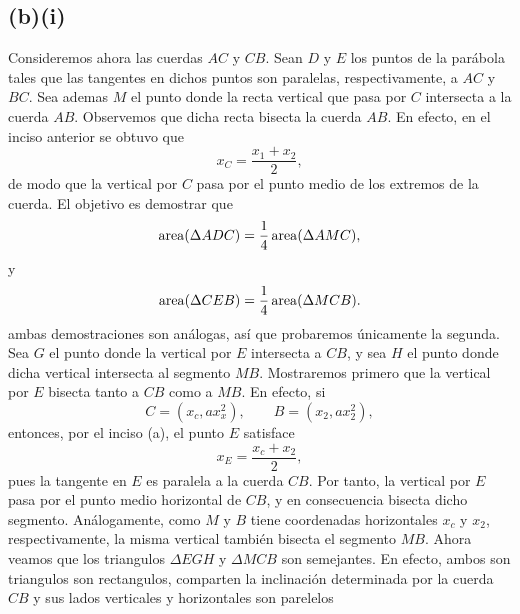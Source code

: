 \documentclass[12pt,a4paper]{article}
\begin{document}
\begin{solucion}
        \subsection*{(b)(i)}
        Consideremos ahora las cuerdas $AC$ y $CB$. Sean $D$ y $E$ los puntos de la parábola
        tales que las tangentes en dichos puntos son paralelas, respectivamente, a $AC$ y
        $BC$. Sea ademas $M$ el punto donde la recta vertical que pasa por $C$ intersecta
        a la cuerda $AB$. Observemos que dicha recta bisecta la cuerda $AB$. En efecto,
        en el inciso anterior se obtuvo que
        \begin{equation*}
            x_{C}=\frac{x_{1}+x_{2}}{2},
        \end{equation*}
        de modo que la vertical por $C$ pasa por el punto medio de los extremos de la cuerda.
        El objetivo es demostrar que
        \begin{equation*}
            \operatorname{area}(\Delta ADC)=\frac{1}{4}\operatorname{area}(\Delta AMC),
        \end{equation*}
        y
        \begin{equation*}
            \operatorname{area}(\Delta CEB)=\frac{1}{4}\operatorname{area}(\Delta MCB).
        \end{equation*}
        ambas demostraciones son análogas, así que probaremos únicamente
        la segunda. Sea $G$ el punto donde la vertical por $E$ intersecta
        a $CB$, y sea $H$ el punto donde dicha vertical intersecta al segmento
        $MB$. Mostraremos primero que la vertical por $E$ bisecta tanto a $CB$ como a $MB$.
        En efecto, si
        \begin{equation*}
            C=(x_{c},ax_{x}^{2}),\qquad B=(x_{2},ax_{2}^{2}),
        \end{equation*}
        entonces, por el inciso (a), el punto $E$ satisface
        \begin{equation*}
            x_{E}=\frac{x_{c}+x_{2}}{2},
        \end{equation*}
        pues la tangente en $E$ es paralela a la cuerda $CB$. Por tanto, la vertical
        por $E$ pasa por el punto medio horizontal de $CB$, y en consecuencia bisecta
        dicho segmento. Análogamente, como $M$ y $B$ tiene coordenadas horizontales
        $x_{c}$ y $x_{2}$, respectivamente, la misma vertical también bisecta el
        segmento $MB$. Ahora veamos que los triangulos $\Delta EGH$ y $\Delta MCB$
        son semejantes. En efecto, ambos son triangulos son rectangulos, comparten la inclinación
        determinada por la cuerda $CB$ y sus lados verticales y horizontales son parelelos

\end{solucion}
\end{document}

